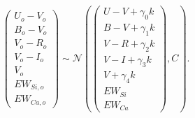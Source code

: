 \documentclass[11pt, oneside]{article}   	%
\begin{document}
\begin{equation}
\left(
\begin{matrix}
U_o-V_o\\B_o-V_o\\V_o-R_o\\V_o-I_o\\V_o\\EW_{Si, o}\\ EW_{Ca, o}
\end{matrix}
\right) \sim \mathcal{N}
\left(
\left(
\begin{matrix}
U-V +\gamma_0 k \\B-V +\gamma_1 k \\V-R+\gamma_2 k\\V-I+\gamma_3 k\\V+\gamma_4 k\\
EW_{Si}\\ EW_{Ca}
\end{matrix}
\right)
,C
\right).
\end{equation}
\end{document}
